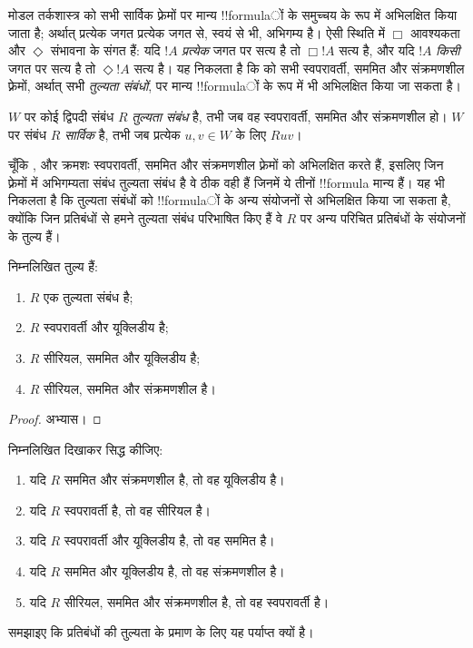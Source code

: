 \documentclass[../../../include/open-logic-section]{subfiles}
\begin{document}


मोडल तर्कशास्त्र  को सभी सार्विक फ़्रेमों पर मान्य !!{formula}ों के
समुच्चय के रूप में अभिलक्षित किया जाता है; अर्थात् प्रत्येक जगत प्रत्येक
जगत से, स्वयं से भी, अभिगम्य है। ऐसी स्थिति में $\Box$ आवश्यकता और
$\Diamond$ संभावना के संगत हैं: यदि $!A$ \emph{प्रत्येक} जगत पर सत्य है तो
$\Box !A$ सत्य है, और यदि $!A$ \emph{किसी} जगत पर सत्य है तो $\Diamond !A$
सत्य है। यह निकलता है कि  को सभी स्वपरावर्ती, सममित और संक्रमणशील
फ़्रेमों, अर्थात् सभी \emph{तुल्यता संबंधों}, पर मान्य !!{formula}ों के रूप
में भी अभिलक्षित किया जा सकता है।

\begin{defn}
  $W$ पर कोई द्विपदी संबंध $R$ \emph{तुल्यता संबंध} है, तभी जब वह
  स्वपरावर्ती, सममित और संक्रमणशील हो। $W$ पर संबंध $R$ \emph{सार्विक} है,
  तभी जब प्रत्येक $u,v \in W$ के लिए $Ruv$।
\end{defn}

चूँकि ,  और  क्रमशः स्वपरावर्ती, सममित और संक्रमणशील
फ़्रेमों को अभिलक्षित करते हैं, इसलिए जिन फ़्रेमों में अभिगम्यता संबंध
तुल्यता संबंध है वे ठीक वही हैं जिनमें ये तीनों !!{formula} मान्य हैं। यह भी
निकलता है कि तुल्यता संबंधों को !!{formula}ों के अन्य संयोजनों से अभिलक्षित
किया जा सकता है, क्योंकि जिन प्रतिबंधों से हमने तुल्यता संबंध परिभाषित किए
हैं वे $R$ पर अन्य परिचित प्रतिबंधों के संयोजनों के तुल्य हैं।

\begin{prop}
  निम्नलिखित तुल्य हैं:
  \begin{enumerate}
  \item $R$ एक तुल्यता संबंध है;
  \item $R$ स्वपरावर्ती और यूक्लिडीय है;
  \item $R$ सीरियल, सममित और यूक्लिडीय है;
  \item $R$ सीरियल, सममित और संक्रमणशील है।
  \end{enumerate}
\end{prop}

\begin{proof}
  अभ्यास।
\end{proof}

\begin{prob}
  निम्नलिखित दिखाकर  सिद्ध कीजिए:
  \begin{enumerate}
  \item यदि $R$ सममित और संक्रमणशील है, तो वह यूक्लिडीय है।
  \item यदि $R$ स्वपरावर्ती है, तो वह सीरियल है।
  \item यदि $R$ स्वपरावर्ती और यूक्लिडीय है, तो वह सममित है।
  \item यदि $R$ सममित और यूक्लिडीय है, तो वह संक्रमणशील है।
  \item यदि $R$ सीरियल, सममित और संक्रमणशील है, तो वह स्वपरावर्ती है।
  \end{enumerate}
  समझाइए कि प्रतिबंधों की तुल्यता के प्रमाण के लिए यह पर्याप्त क्यों है।
\end{prob}
\end{document}
